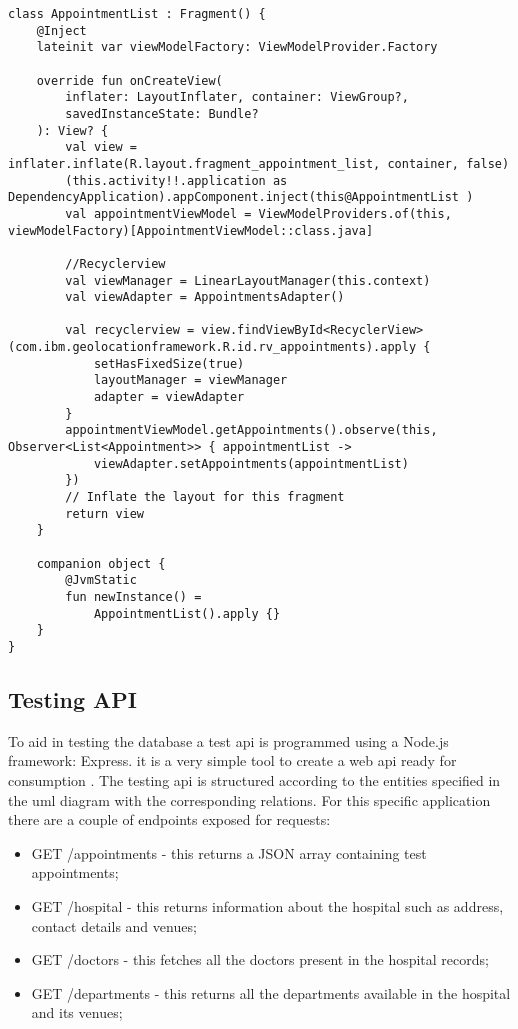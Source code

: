 \begin{verbatim}
class AppointmentList : Fragment() {
    @Inject
    lateinit var viewModelFactory: ViewModelProvider.Factory

    override fun onCreateView(
        inflater: LayoutInflater, container: ViewGroup?,
        savedInstanceState: Bundle?
    ): View? {
        val view = inflater.inflate(R.layout.fragment_appointment_list, container, false)
        (this.activity!!.application as DependencyApplication).appComponent.inject(this@AppointmentList )
        val appointmentViewModel = ViewModelProviders.of(this, viewModelFactory)[AppointmentViewModel::class.java]

        //Recyclerview
        val viewManager = LinearLayoutManager(this.context)
        val viewAdapter = AppointmentsAdapter()

        val recyclerview = view.findViewById<RecyclerView>(com.ibm.geolocationframework.R.id.rv_appointments).apply {
            setHasFixedSize(true)
            layoutManager = viewManager
            adapter = viewAdapter
        }
        appointmentViewModel.getAppointments().observe(this, Observer<List<Appointment>> { appointmentList ->
            viewAdapter.setAppointments(appointmentList)
        })
        // Inflate the layout for this fragment
        return view
    }

    companion object {
        @JvmStatic
        fun newInstance() =
            AppointmentList().apply {}
    }
}
\end{verbatim}
\subsection{Testing API}
To aid in testing the database a test \acrshort{api} is programmed using a Node.js framework: Express. it is a very simple tool to create a web \acrshort{api} ready for consumption \cite{Express2019}. The testing \acrshort{api} is structured according to the entities specified in the \acrshort{uml} diagram with the corresponding relations. For this specific application there are a couple of endpoints exposed for requests:
\begin{itemize}
\item GET /appointments - this returns a JSON array containing test appointments;
\item GET /hospital - this returns information about the hospital such as address, contact details and venues;
\item GET /doctors - this fetches all the doctors present in the hospital records;
\item GET /departments - this returns all the departments available in the hospital and its venues;
\end{itemize}

